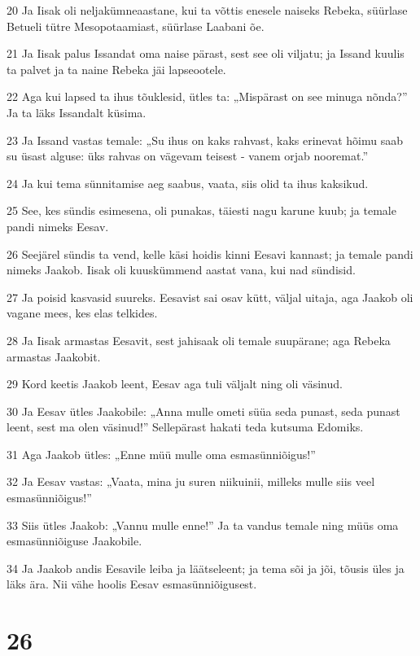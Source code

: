 \par 20 Ja Iisak oli neljakümneaastane, kui ta võttis enesele naiseks Rebeka, süürlase Betueli tütre Mesopotaamiast, süürlase Laabani õe.
\par 21 Ja Iisak palus Issandat oma naise pärast, sest see oli viljatu; ja Issand kuulis ta palvet ja ta naine Rebeka jäi lapseootele.
\par 22 Aga kui lapsed ta ihus tõuklesid, ütles ta: „Mispärast on see minuga nõnda?” Ja ta läks Issandalt küsima.
\par 23 Ja Issand vastas temale: „Su ihus on kaks rahvast, kaks erinevat hõimu saab su üsast alguse: üks rahvas on vägevam teisest - vanem orjab nooremat.”
\par 24 Ja kui tema sünnitamise aeg saabus, vaata, siis olid ta ihus kaksikud.
\par 25 See, kes sündis esimesena, oli punakas, täiesti nagu karune kuub; ja temale pandi nimeks Eesav.
\par 26 Seejärel sündis ta vend, kelle käsi hoidis kinni Eesavi kannast; ja temale pandi nimeks Jaakob. Iisak oli kuuskümmend aastat vana, kui nad sündisid.
\par 27 Ja poisid kasvasid suureks. Eesavist sai osav kütt, väljal uitaja, aga Jaakob oli vagane mees, kes elas telkides.
\par 28 Ja Iisak armastas Eesavit, sest jahisaak oli temale suupärane; aga Rebeka armastas Jaakobit.
\par 29 Kord keetis Jaakob leent, Eesav aga tuli väljalt ning oli väsinud.
\par 30 Ja Eesav ütles Jaakobile: „Anna mulle ometi süüa seda punast, seda punast leent, sest ma olen väsinud!” Sellepärast hakati teda kutsuma Edomiks.
\par 31 Aga Jaakob ütles: „Enne müü mulle oma esmasünniõigus!”
\par 32 Ja Eesav vastas: „Vaata, mina ju suren niikuinii, milleks mulle siis veel esmasünniõigus!”
\par 33 Siis ütles Jaakob: „Vannu mulle enne!” Ja ta vandus temale ning müüs oma esmasünniõiguse Jaakobile.
\par 34 Ja Jaakob andis Eesavile leiba ja läätseleent; ja tema sõi ja jõi, tõusis üles ja läks ära. Nii vähe hoolis Eesav esmasünniõigusest.

\chapter{26}

